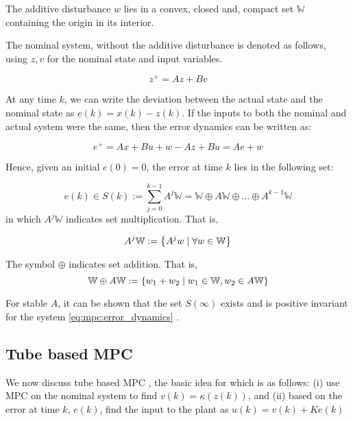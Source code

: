 \begin{assumption}
\label{ass:mpc:W}
The additive disturbance $w$ lies in a convex, closed and, compact set $\mathbb{W}$
containing the origin in its interior.
\end{assumption}

The nominal system, without the additive disturbance is denoted as
follows, using $z,v$ for the nominal state and input variables.

\begin{equation}
\label{eq:mpc:model_nominal}
z^+ = Az + Bv
\end{equation}

At any time $k$, we can write the deviation between the actual state
and the nominal state as $e(k) = x(k)-z(k)$. If the inputs to both the
nominal and actual system were the same, then the error dynamics can
be written as:

\begin{equation}
\label{eq:mpc:error_dynamics}
e^+ = Ax+Bu+w - Az+Bu = Ae + w
\end{equation}

Hence, given an initial $e(0)=0$, the error at time $k$ lies in the
following set:

\begin{equation}
\label{eq:mpc:error_set}
e(k) \in S(k) :=\sum_{j=0}^{k-1}A^j\mathbb{W} = \mathbb{W} \oplus A\mathbb{W}
\oplus \ldots \oplus A^{k-1}\mathbb{W}
\end{equation}
in which $A^j\mathbb{W}$ indicates set multiplication. That is,

\[A^j\mathbb{W} := \left\lbrace A^jw \mid \forall w \in \mathbb{W} \right\rbrace
\]

The symbol $\oplus$ indicates set addition. That is,
\[ \mathbb{W} \oplus A\mathbb{W} := \left\lbrace w_1+w_2 \mid w_1 \in
  \mathbb{W}, w_2 \in A\mathbb{W} \right\rbrace\]

For stable $A$, it can be shown that the set $S(\infty)$ exists and is
positive invariant for the system \eqref{eq:mpc:error_dynamics}
\citep{kolmanovsky:gilbert:1998}.


\subsection{Tube based MPC}

We now discuss tube based MPC \citep[Chapter 3]{rawlings:mayne:2009}, the basic idea for which is as follows: (i)
use MPC on the nominal system to find $v(k) = \kappa(z(k))$,  and (ii)
based on the error at time $k$, $e(k)$, find the input to the plant as $u(k) = v(k) + Ke(k)$

